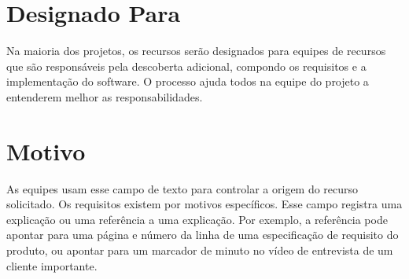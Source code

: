 \documentclass{report}
\begin{document}
\section{Designado Para}

Na maioria dos projetos, os recursos serão designados para equipes de recursos que são responsáveis pela descoberta adicional, compondo os requisitos e a implementação do software. O processo ajuda todos na equipe do projeto a entenderem melhor as responsabilidades.

\section{Motivo}

As equipes usam esse campo de texto para controlar a origem do recurso solicitado. Os requisitos existem por motivos específicos. Esse campo registra uma explicação ou uma referência a uma explicação. Por exemplo, a referência pode apontar para uma página e número da linha de uma especificação de requisito do produto, ou apontar para um marcador de minuto no vídeo de entrevista de um cliente importante.
\end{document}
